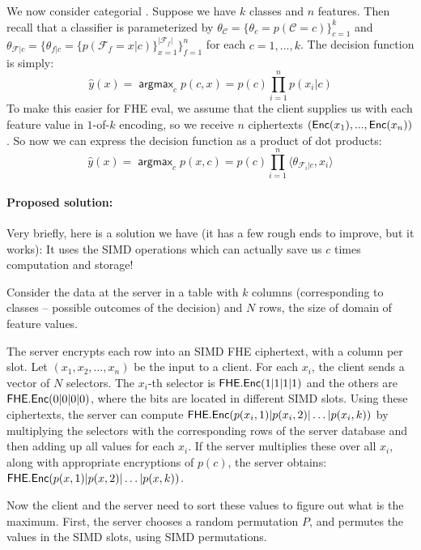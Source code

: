 \documentclass[11pt]{article}
\DeclareMathOperator*{\argmax}{\mathsf{argmax}}
\begin{document}
We now consider categorial \NB{}. Suppose we have $k$ classes and $n$ features.
Then recall that a \NB{} classifier is parameterized by $\theta_{\mathcal{C}} =
\{\theta_{c}=p(\mathcal{C}=c)\}_{c=1}^{k}$ and $\theta_{\mathcal{F}|c} =
\{\theta_{f|c}= \{ p(\mathcal{F}_f=x|c) \}_{x=1}^{|\mathcal{F}_f|}
\}_{f=1}^{n}$ for each $c = 1,...,k$. The decision function is simply:
\begin{equation*}
  \hat{y}(x) = \argmax_{c} p(c, x) = p(c)\prod\limits_{i=1}^{n}p(x_i|c)
\end{equation*}
To make this easier for FHE eval, we assume that the client supplies us with each feature value
in $1$-of-$k$ encoding, so we receive $n$ ciphertexts $(\mathsf{Enc}(x_1), ..., \mathsf{Enc}(x_n))$. So now we
can express the decision function as a product of dot products:
\begin{equation*}
  \hat{y}(x) = \argmax_{c} p(x,c) = p(c)\prod\limits_{i=1}^{n} \langle \theta_{\mathcal{F}_i|c}, x_i \rangle
\end{equation*}

      
\paragraph{Proposed solution:}
Very briefly, here is a solution we have (it has a few rough ends to improve, but it works): It uses the SIMD operations which can actually save us $c$ times computation and storage!

Consider the data at the server in a table with $k$ columns (corresponding to classes -- possible outcomes of the decision) and $N$ rows, the size of domain of feature values. 

The server encrypts each row into an SIMD FHE ciphertext, with a column per slot. 
Let $(x_1, x_2, \dots, x_n)$ be the input to a client.
For each $x_i$, the client sends a vector of $N$ selectors. The $x_i$-th selector is $\mathsf{FHE.Enc}(1|1|1|1)$ and the others are $\mathsf{FHE.Enc}(0|0|0|0)$, where the bits are located in different SIMD slots. Using these ciphertexts, the server can compute $\mathsf{FHE.Enc}(p(x_i, 1)|p(x_i, 2)| \dots | p(x_i, k))$ by multiplying the selectors with the corresponding rows of the server database and then adding up all values for each $x_i$.  If the server multiplies these over all $x_i$, along with appropriate encryptions of $p(c)$, the server obtains:
 $\mathsf{FHE.Enc}(p(x,1)|p(x, 2)| \dots | p(x, k))$.
 
 Now the client and the server need to sort these values to figure out what is the maximum.
 First, the server chooses a random permutation $P$, and permutes the values in the SIMD slots, using SIMD permutations.
 
\end{document}
